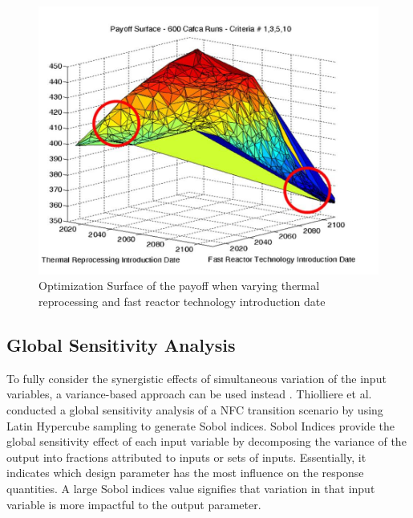 \begin{figure}[]
	\begin{center}
		\includegraphics[scale=0.45]{./figures/passerini_payoff.jpg}
	\end{center}	
		\caption{Optimization Surface of the payoff when varying thermal 
		reprocessing and fast reactor technology introduction date
		\cite{passerini_systematic_2014}}
	\label{fig:passerini_payoff}
\end{figure} 

\subsection{Global Sensitivity Analysis}
\label{sec:sobol}
To fully consider the synergistic effects of
simultaneous variation of the input variables, a variance-based 
approach can be used instead \cite{thiolliere_methodology_2018}.
Thiolliere et al. conducted a global sensitivity analysis of a 
\gls{NFC} transition scenario by using Latin Hypercube sampling 
to generate Sobol indices. 
Sobol Indices provide the global sensitivity effect of each 
input variable by decomposing the variance of the output into 
fractions attributed to inputs or sets of inputs.
Essentially, it indicates which design parameter has 
the most influence on the response quantities.
A large Sobol indices value signifies that variation in that input 
variable is more impactful to the output parameter.

